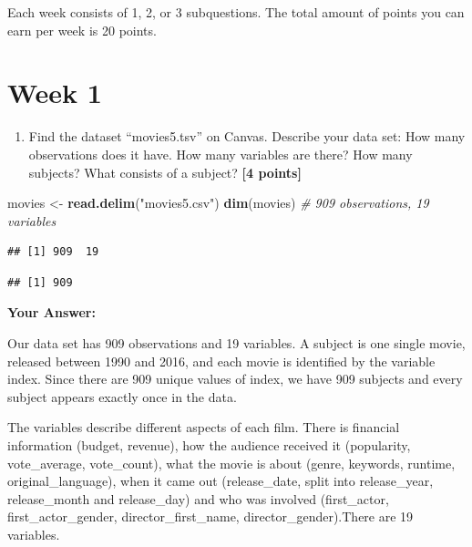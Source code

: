 \documentclass[
]{article}
\newenvironment{Shaded}{\begin{snugshade}}{\end{snugshade}}
\newcommand{\CommentTok}[1]{\textcolor[rgb]{0.56,0.35,0.01}{\textit{#1}}}
\newcommand{\FunctionTok}[1]{\textcolor[rgb]{0.13,0.29,0.53}{\textbf{#1}}}
\newcommand{\NormalTok}[1]{#1}
\newcommand{\OtherTok}[1]{\textcolor[rgb]{0.56,0.35,0.01}{#1}}
\newcommand{\SpecialCharTok}[1]{\textcolor[rgb]{0.81,0.36,0.00}{\textbf{#1}}}
\newcommand{\StringTok}[1]{\textcolor[rgb]{0.31,0.60,0.02}{#1}}
\providecommand{\tightlist}{%
  \setlength{\itemsep}{0pt}\setlength{\parskip}{0pt}}
\begin{document}
Each week consists of 1, 2, or 3 subquestions. The total amount of
points you can earn per week is 20 points.

\section{Week 1}\label{week-1}

\begin{enumerate}
\def\labelenumi{\arabic{enumi}.}
\tightlist
\item
  Find the dataset ``movies5.tsv'' on Canvas. Describe your data set:
  How many observations does it have. How many variables are there? How
  many subjects? What consists of a subject? \textbf{[4 points]}
\end{enumerate}

\begin{Shaded}
\begin{Highlighting}[]
\NormalTok{movies }\OtherTok{\textless{}{-}} \FunctionTok{read.delim}\NormalTok{(}\StringTok{"movies5.csv"}\NormalTok{)   }
\FunctionTok{dim}\NormalTok{(movies)                           }\CommentTok{\# 909 observations, 19 variables}
\end{Highlighting}
\end{Shaded}

\begin{verbatim}
## [1] 909  19
\end{verbatim}

\begin{Shaded}
\end{Shaded}

\begin{verbatim}
## [1] 909
\end{verbatim}

\textbf{Your Answer:}

Our data set has 909 observations and 19 variables. A subject is one
single movie, released between 1990 and 2016, and each movie is
identified by the variable index. Since there are 909 unique values of
index, we have 909 subjects and every subject appears exactly once in
the data.

The variables describe different aspects of each film. There is
financial information (budget, revenue), how the audience received it
(popularity, vote\_average, vote\_count), what the movie is about
(genre, keywords, runtime, original\_language), when it came out
(release\_date, split into release\_year, release\_month and
release\_day) and who was involved (first\_actor, first\_actor\_gender,
director\_first\_name, director\_gender).There are 19 variables.
\end{document}
